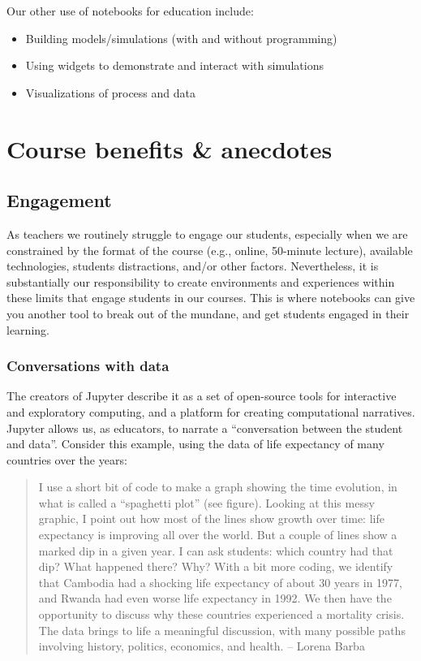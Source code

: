 \documentclass[]{book}
\providecommand{\tightlist}{%
  \setlength{\itemsep}{0pt}\setlength{\parskip}{0pt}}
\begin{document}
Our other use of notebooks for education include:

\begin{itemize}
\tightlist
\item
  Building models/simulations (with and without programming)
\item
  Using widgets to demonstrate and interact with simulations
\item
  Visualizations of process and data
\end{itemize}

\hypertarget{course-benefits-anecdotes}{%
\section{Course benefits \& anecdotes}\label{course-benefits-anecdotes}}

\hypertarget{engagement}{%
\subsection{Engagement}\label{engagement}}

As teachers we routinely struggle to engage our students, especially when we are
constrained by the format of the course (e.g., online, 50-minute lecture),
available technologies, students distractions, and/or other factors.
Nevertheless, it is substantially our responsibility to create environments and
experiences within these limits that engage students in our courses. This is
where notebooks can give you another tool to break out of the mundane, and get
students engaged in their learning.

\hypertarget{conversations-with-data}{%
\subsubsection{Conversations with data}\label{conversations-with-data}}

The creators of Jupyter describe it as a set of open-source tools for
interactive and exploratory computing, and a platform for creating computational
narratives. Jupyter allows us, as educators, to narrate a ``conversation between
the student and data''. Consider this example, using the data of life expectancy
of many countries over the years:

\begin{quote}
I use a short bit of code to make a graph showing the time evolution, in what
is called a ``spaghetti plot'' (see figure). Looking at this messy graphic, I
point out how most of the lines show growth over time: life expectancy is
improving all over the world. But a couple of lines show a marked dip in a
given year. I can ask students: which country had that dip? What happened
there? Why? With a bit more coding, we identify that Cambodia had a shocking
life expectancy of about 30 years in 1977, and Rwanda had even worse life
expectancy in 1992. We then have the opportunity to discuss why these
countries experienced a mortality crisis. The data brings to life a meaningful
discussion, with many possible paths involving history, politics, economics,
and health. -- Lorena Barba
\end{quote}
\end{document}
